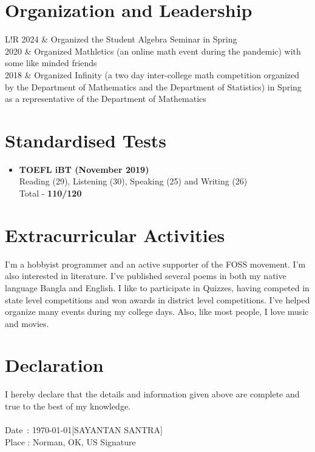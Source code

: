 \documentclass{article}
\newcommand\VRule{\color{lightgray}\vrule width 0.5pt}
\begin{document}
\section*{Organization and Leadership}
\begin{tabular}{L!{\VRule}R}
	2024 & Organized the Student Algebra Seminar in Spring                                                                                                                                                          \\
	2020 & Organized Mathletics (an online math event during the pandemic) with some like minded friends                                                                                                            \\
	2018 & Organized Infinity (a two day inter-college math competition organized by the Department of Mathematics and the Department of Statistics) in Spring as a representative of the Department of Mathematics
\end{tabular}

\section*{Standardised Tests}
\begin{itemize}
	\item {\bf TOEFL iBT (November 2019)} \\
	      Reading (29), Listening (30), Speaking (25) and Writing (26) \\
	      Total - {\bf 110/120}
\end{itemize}

\section*{Extracurricular Activities}
I'm a hobbyist programmer and an active supporter of the FOSS movement. I'm also interested in literature. I've published several poems in both my native language Bangla and English. I like to participate in Quizzes, having competed in state level competitions and won awards in district level competitions. I've helped organize many events during my college days. Also, like most people, I love music and movies.

\section*{Declaration}
I hereby declare that the details and information given above are complete and true to the best of my knowledge. \\
\vspace{2cm} \\
Date \,: \today \hfill [SAYANTAN SANTRA] \\
Place  : Norman, OK, US \hfill Signature \hspace{1cm} \\
\end{document}
